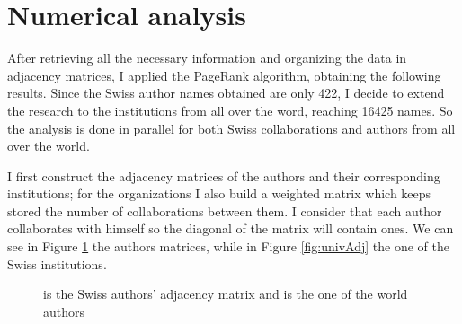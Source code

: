 \documentclass[]{usiinfbachelorproject}
\begin{document}
\section{Numerical analysis}
After retrieving all the necessary information and organizing the data in adjacency matrices, I applied the PageRank algorithm, obtaining the following results.
Since the Swiss author names obtained are only 422, I decide to extend the research to the institutions from all over the word, reaching 16425 names. So the analysis is done in parallel for both Swiss collaborations and authors from all over the world.

I first construct the adjacency matrices of the authors and their corresponding institutions; for the organizations I also build a weighted matrix which keeps stored the number of collaborations between them. I consider that each author collaborates with himself so the diagonal of the matrix will contain ones.
We can see in Figure \ref{fig:authorsAdj} the authors matrices, while in Figure \ref{fig:univAdj} the one of the Swiss institutions.

\begin{figure}[tb]
	\centering
	\caption{ is the Swiss authors' adjacency matrix and  is the one of the world authors}
	\label{fig:authorsAdj}
\end{figure}
\end{document}
